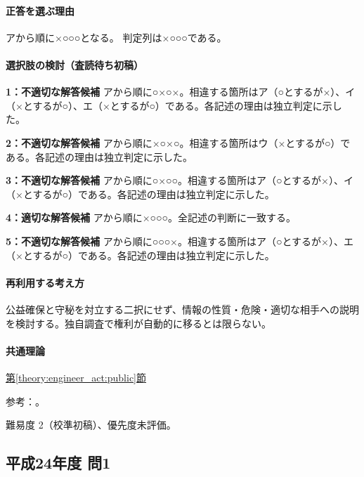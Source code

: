 \paragraph{正答を選ぶ理由} アから順に×○○○となる。  判定列は×○○○である。

\paragraph{選択肢の検討（査読待ち初稿）}\mbox{}\par

\noindent\textbf{1：不適切な解答候補} アから順に○×○×。相違する箇所はア（○とするが×）、イ（×とするが○）、エ（×とするが○）である。各記述の理由は独立判定に示した。\par

\noindent\textbf{2：不適切な解答候補} アから順に×○×○。相違する箇所はウ（×とするが○）である。各記述の理由は独立判定に示した。\par

\noindent\textbf{3：不適切な解答候補} アから順に○×○○。相違する箇所はア（○とするが×）、イ（×とするが○）である。各記述の理由は独立判定に示した。\par

\noindent\textbf{4：適切な解答候補} アから順に×○○○。全記述の判断に一致する。\par

\noindent\textbf{5：不適切な解答候補} アから順に○○○×。相違する箇所はア（○とするが×）、エ（×とするが○）である。各記述の理由は独立判定に示した。\par

\paragraph{再利用する考え方} 公益確保と守秘を対立する二択にせず、情報の性質・危険・適切な相手への説明を検討する。独自調査で権利が自動的に移るとは限らない。

\paragraph{共通理論} \hyperref[theory:engineer_act:public]{第\ref*{theory:engineer_act:public}節}

\par 参考：\cite{engineer_act_current,cpd_v3}。

\par 難易度 2（校準初稿）、優先度未評価。

\subsection{平成24年度 問1}
\label{q:h24-reg-apt-01}

